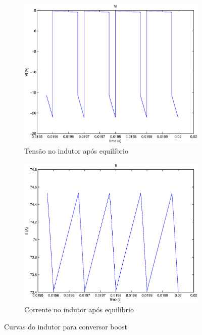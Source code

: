 \documentclass{article}
\begin{document}
\begin{figure}[H]
\begin{subfigure}[b]{0.4\linewidth}
		\includegraphics[width=\linewidth]{matlab/boost/b_vlst}
		\caption{Tensão no indutor após equilíbrio}
	\end{subfigure}
	\begin{subfigure}[b]{0.4\linewidth}
		\centering
		\includegraphics[width=\linewidth]{matlab/boost/b_ilst}
		\caption{Corrente no indutor após equilíbrio}
	\end{subfigure}
	\caption{Curvas do indutor para conversor boost}
	\label{fig:bol}
\end{figure}
\end{document}
